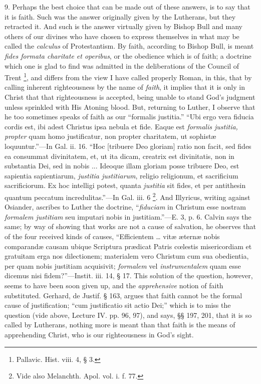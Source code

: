 9. Perhaps the best choice that can be made out of these answers,
is to say that it is faith. Such was the answer originally given by
the Lutherans, but they retracted it. And such is the answer virtually
given by Bishop Bull and many others of our divines who have chosen to
express themselves in what may be called the \emph{calculus} of
Protestantism. By faith, according to Bishop Bull, is meant \emph{fides
formata charitate et operibus}, or the obedience which is of faith;
a doctrine which one is glad to find was admitted in the deliberations
of the Council of Trent \footnote{Pallavic.
Hist. viii. 4, § 3.},
and differs from the view I have called properly Roman, in this, that
by calling inherent righteousness by the name of \emph{faith}, it
implies that it is only in Christ that that righteousness is accepted,
being unable to stand God's judgment unless sprinkled with His Atoning
blood. But, returning to Luther, I observe that he too sometimes
speaks of faith as our ``formalis justitia.'' ``Ubi ergo
vera fiducia cordis est, ibi adest Christus ipsa nebula et fide.
Eaque est \emph{formalis justitia, propter} quam homo justificatur,
non propter charitatem, ut sophistæ loquuntur.''—In Gal. ii.
16. ``Hoc [tribuere Deo gloriam] ratio non facit, sed fides ea
consummat divinitatem, et, ut ita dicam, creatrix est divinitatis, non
in substantia Dei, sed in nobis ... Ideoque illam gloriam posse
tribuere Deo, est sapientia sapientiarum, \emph{justitia justitiarum},
religio religionum, et sacrificium sacrificiorum. Ex hoc intelligi
potest, quanta \emph{justitia} sit fides, et per antithesin quantum
peccatum incredulitas.''—In Gal. iii. 6 \footnote{Vide also
Melanchth. Apol. vol. i. f. 77.}. And Illyricus, writing against Osiander, ascribes to Luther
the doctrine, ``\emph{fiduciam} in Christum esse nostram \emph{formalem
justitiam} seu imputari nobis in justitiam.''—E. 3, p. 6.
Calvin says the same; by way of showing that works are not a cause of
salvation, he observes that of the four received kinds of causes,
``Efficientem … vitæ æternæ nobis comparandæ causam ubique
Scriptura prædicat Patris cœlestis misericordiam et gratuitam erga
nos dilectionem; materialem vero Christum cum sua obedientia, per quam
nobis justitiam acquisivit; \emph{formalem} vel \emph{instrumentalem}
quam esse dicemus nisi fidem?''—Instit. iii. 14, § 17. This
solution of the question, however, seems to have been soon given up,
and the \emph{apprehensive} notion of faith substituted. Gerhard, de
Justif. § 163, argues that faith cannot be the formal cause of
justification; ``cum justificatio sit actio Dei;'' which is to
miss the question (vide above, Lecture IV. pp. 96, 97), and says, §§
197, 201, that it is so called by Lutherans, nothing more is meant
than that faith is the means of apprehending Christ, who is our
righteousness in God's sight.

